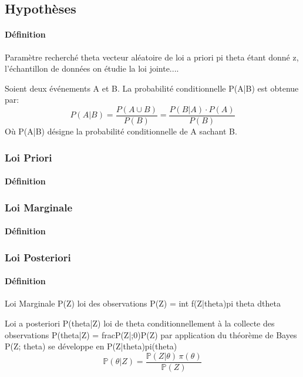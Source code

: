 \documentclass{article}
\begin{document}
\subsection{Hypothèses}
\paragraph{Définition}Paramètre recherché theta vecteur aléatoire de loi a priori pi theta étant donné z, l'échantillon de données on étudie la loi jointe....
\begin{theorem}
    Soient deux événements A et B. La probabilité conditionnelle P(A|B) est obtenue par:
    \begin{equation}
        \boxed{
            P(A|B) = \frac{P(A \cup B)}{P(B)} = \frac{P(B|A)\cdot P(A)}{P(B)}
        }
    \end{equation}
    Où P(A|B) désigne la probabilité conditionnelle de A sachant B.
\end{theorem}

\subsubsection{Loi Priori}
\paragraph{Définition}

\subsubsection{Loi Marginale}
\paragraph{Définition}

\subsubsection{Loi Posteriori}
\paragraph{Définition}


Loi Marginale P(Z) loi des observations
P(Z) = int f(Z|theta)pi theta dtheta

Loi a posteriori P(theta|Z) loi de theta conditionnellement à la collecte des observations P(theta|Z) = frac{P(Z|;0)}{P(Z)} par application du théorème de Bayes P(Z; theta) se développe en P(Z|theta)pi(theta)
\begin{equation}
    \mathbb{P}(\theta | Z) = \frac{\mathbb{P}(Z|\theta)\,\pi(\theta)}{\mathbb{P}(Z)}
\end{equation}
\end{document}
